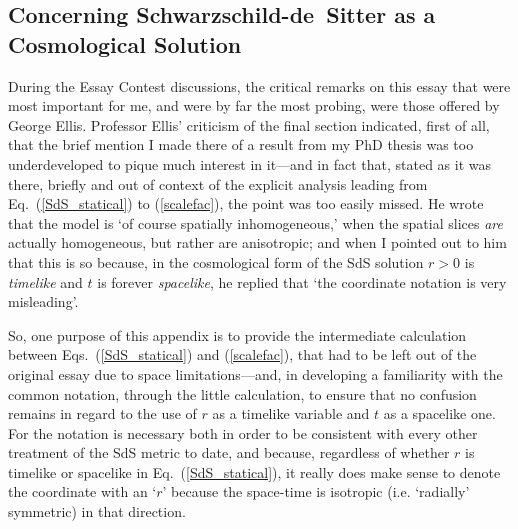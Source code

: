 \documentclass[11pt]{article}
\begin{document}
\begin{appendix}
\section{Concerning Schwarzschild-de~Sitter as a Cosmological Solution\label{sec_CSdSCS}}
During the Essay Contest discussions, the critical remarks on this essay that were most important for me, and were by far the most probing, were those offered by George Ellis. Professor Ellis' criticism of the final section indicated, first of all, that the brief mention I made there of a result from my PhD thesis was too underdeveloped to pique much interest in it---and in fact that, stated as it was there, briefly and out of context of the explicit analysis leading from Eq.~(\ref{SdS_statical}) to (\ref{scalefac}), the point was too easily missed. He wrote that the model is `of course spatially inhomogeneous,' when the spatial slices \textit{are} actually homogeneous, but rather are anisotropic; and when I pointed out to him that this is so because, in the cosmological form of the SdS solution $r>0$ is \textit{timelike} and $t$ is forever \textit{spacelike}, he replied that `the coordinate notation is very misleading'. 

So, one purpose of this appendix is to provide the intermediate calculation between Eqs.~(\ref{SdS_statical}) and (\ref{scalefac}), that had to be left out of the original essay due to space limitations---and, in developing a familiarity with the common notation, through the little calculation, to ensure that no confusion remains in regard to the use of $r$ as a timelike variable and $t$ as a spacelike one. For the notation is necessary both in order to be consistent with every other treatment of the SdS metric to date, and because, regardless of whether $r$ is timelike or spacelike in Eq.~(\ref{SdS_statical}), it really does make sense to denote the coordinate with an `$r$' because the space-time is isotropic (i.e. `radially' symmetric) in that direction. 


\end{appendix}
\end{document}
